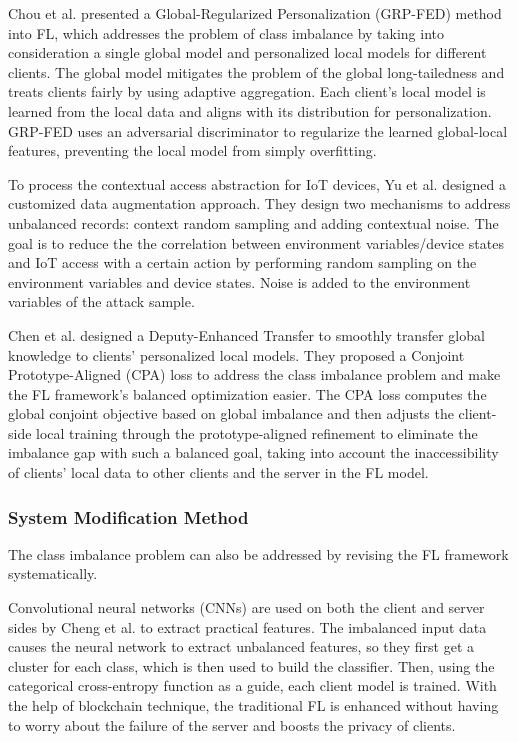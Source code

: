 \documentclass[10pt,journal,compsoc]{IEEEtran}
\begin{document}
Chou et al. \cite{chou2022grp} presented a Global-Regularized Personalization (GRP-FED) method into FL, which addresses the problem of class imbalance by taking into consideration a single global model and personalized local models for different clients. The global model mitigates the problem of the global long-tailedness and treats clients fairly by using adaptive aggregation. Each client's local model is learned from the local data and aligns with its distribution for personalization. GRP-FED uses an adversarial discriminator to regularize the learned global-local features, preventing the local model from simply overfitting. 

To process the contextual access abstraction for IoT devices, Yu et al. \cite{yu2020learning} designed a customized data augmentation approach. They design two mechanisms to address unbalanced records: context random sampling and adding contextual noise. The goal is to reduce the the correlation between environment variables/device states and IoT access with a certain action by performing random sampling on the environment variables and device states. Noise is added to the environment variables of the attack sample.

Chen et al.\cite{chen2022personalized} designed a Deputy-Enhanced Transfer to smoothly transfer global knowledge to clients' personalized local models. They proposed a Conjoint Prototype-Aligned (CPA) loss to address the class imbalance problem and make the FL framework's balanced optimization easier. The CPA loss computes the global conjoint objective based on global imbalance and then adjusts the client-side local training through the prototype-aligned refinement to eliminate the imbalance gap with such a balanced goal, taking into account the inaccessibility of clients' local data to other clients and the server in the FL model.
\vspace{-0.2cm}

\subsubsection{System Modification Method}
The class imbalance problem can also be addressed by revising the FL framework systematically.

Convolutional neural networks (CNNs) are used on both the client and server sides by Cheng et al. \cite{cheng2022blockchain} to extract practical features. The imbalanced input data causes the neural network to extract unbalanced features, so they first get a cluster for each class, which is then used to build the classifier. Then, using the categorical cross-entropy function as a guide, each client model is trained. With the help of blockchain technique, the traditional FL is enhanced without having to worry about the failure of the server and boosts the privacy of clients.
\end{document}
